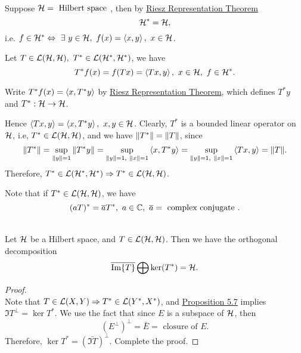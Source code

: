 \vspace{3pt}
\begin{remark}\ \\
Suppose $\mathcal{H} = \text{ Hilbert space }$, then by \hyperref[RRT]{Riesz Representation Theorem}
\begin{equation*}
    \mathcal{H}^* = \mathcal{H},
\end{equation*}
i.e. $f \in \Hs^* \Leftrightarrow\ \exists\ y \in \Hs,\ f(x) = \inprod{x}{y},\ x \in \Hs$.

\np Let $T \in \mathcal{L}(\mathcal{H},\mathcal{H}),\ T^* \in \mathcal{L}(\mathcal{H}^*,\mathcal{H}^*)$, we have
\begin{equation*}
    T^*f(x) = f(Tx) = \left\langle Tx, y \right\rangle,\ x \in \mathcal{H},\ f \in \mathcal{H}^*.
\end{equation*}

\np Write $T^* f(x) = \left\langle x, T^*y \right\rangle$ by \hyperref[RRT]{Riesz Representation Theorem}, which defines $T^*y$ and $T^*: \mathcal{H} \to \mathcal{H}$.

\np Hence $\inprod{Tx}{y} = \inprod{x}{T^* y},\ x,y \in \Hs$. Clearly, $T^*$ is a bounded linear operator on $\mathcal{H}$, i.e, $T^* \in \mathcal{L}(\mathcal{H}, \mathcal{H})$, and we have $\norm{T^*} = \norm{T}$, since
\begin{equation*}
    \norm{T^*} = \sup_{\norm{y} = 1} \norm{T^* y} = \sup_{\norm{y} = 1,\ \norm{x} = 1} \left\langle x, T^* y \right\rangle = \sup_{\norm{y} = 1,\ \norm{x} = 1} \left\langle Tx, y \right\rangle = \norm{T}.
\end{equation*}
Therefore, $T^* \in \mathcal{L}(\mathcal{H}^*,\mathcal{H}^*) \Rightarrow T^* \in \mathcal{L}(\mathcal{H}, \mathcal{H})$.

\np Note that if $T^* \in \mathcal{L}(\mathcal{H},\mathcal{H})$, we have
\begin{equation*}
    (aT)^* = \bar{a} T^*,\ a \in \C,\ \bar{a} = \text{ complex conjugate }.
\end{equation*}
\end{remark}


\vspace{6pt}
\begin{corollary}\ \\
    Let $\mathcal{H}$ be a Hilbert space, and $T \in \mathcal{L}(\mathcal{H},\mathcal{H})$. Then we have the orthogonal decomposition   
    \begin{equation*}
         \overline{\Im{T}} \bigoplus \ker(T^*) = \mathcal{H}.
    \end{equation*}
\end{corollary}
\begin{proof}\ \\
Note that $T \in \mathcal{L}(X,Y) \Rightarrow T^* \in \mathcal{L}(Y^*, X^*)$, and \hyperref[5.7]{Proposition 5.7} implies $\Im{T}^\perp = \ker{T^*}$. We use the fact that since $E$ is a subspace of $\mathcal{H}$, then 
\begin{equation*}
     (E^\perp)^\perp = \bar{E} = \text{ closure of } E.
\end{equation*}
Therefore, $\ker{T^*} = (\bar{\Im{T}})^\perp$. Complete the proof.
\end{proof}


